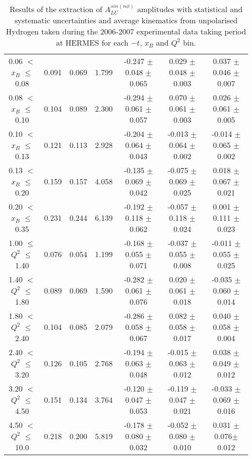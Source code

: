 \begin{table}[width=15cm]
\begin{center}
{\begin{tabular}{|c|c|c|c|c|c|c|}
0.06 $<$ $x_{B}$ $\leqslant$ 0.08 &  0.091 & 0.069 &  1.799 &  -0.247  $\pm$  0.048  $\pm$   0.065 &
0.029 $\pm$  0.048  $\pm$   0.003 & 0.037 $\pm$   0.046  $\pm$   0.007\\
0.08 $<$ $x_{B}$ $\leqslant$ 0.10 &  0.104 & 0.089 &  2.300 &  -0.294 $\pm$  0.061  $\pm$   0.057 &
0.070 $\pm$   0.061  $\pm$   0.003 & 0.026  $\pm$  0.061  $\pm$   0.005\\
0.10 $<$ $x_{B}$ $\leqslant$ 0.13 &  0.121 &  0.113 &  2.928 &  -0.204  $\pm$  0.064   $\pm$  0.043 & 
-0.013  $\pm$  0.064  $\pm$   0.002 & -0.014  $\pm$  0.065  $\pm$   0.002\\
0.13 $<$ $x_{B}$ $\leqslant$ 0.20 &  0.159 & 0.157 &  4.058&  -0.135  $\pm$  0.069  $\pm$   0.042 &
-0.075  $\pm$  0.069  $\pm$   0.025 & 0.018  $\pm$  0.067  $\pm$   0.021 \\
0.20 $<$ $x_{B}$ $\leqslant$ 0.35 &  0.231 & 0.244 &  6.139 &  -0.192 $\pm$ 0.118  $\pm$   0.062 &
-0.057  $\pm$  0.118 $\pm$    0.024 & 0.001  $\pm$  0.111  $\pm$  0.023\\
\hline
1.00 $\leqslant$ $Q^{2}$ $\leqslant$ 1.40 &  0.076 & 0.054  & 1.199 &  -0.168  $\pm$  0.055  $\pm$   0.071 &
-0.037 $\pm$   0.055  $\pm$   0.008 & -0.011  $\pm$  0.055   $\pm$  0.025 \\
1.40 $<$ $Q^{2}$ $\leqslant$ 1.80 &  0.089 & 0.069 &  1.590 &  -0.282 $\pm$  0.061  $\pm$   0.076 &
0.020  $\pm$  0.061  $\pm$   0.018 & -0.035 $\pm$   0.060  $\pm$   0.014\\
1.80 $<$ $Q^{2}$ $\leqslant$ 2.40 &  0.104 & 0.085 &  2.079 &  -0.286 $\pm$   0.058  $\pm$   0.067 &
0.082 $\pm$   0.058  $\pm$   0.017 & 0.040  $\pm$  0.058  $\pm$   0.004\\
2.40 $<$ $Q^{2}$ $\leqslant$ 3.20 &  0.126 & 0.105  & 2.768 &  -0.194 $\pm$   0.063  $\pm$   0.048 &
-0.015  $\pm$  0.063 $\pm$    0.012 & 0.038   $\pm$ 0.049  $\pm$   0.012\\
3.20 $<$ $Q^{2}$ $\leqslant$ 4.50 &  0.151 & 0.134 &  3.764 &  -0.120 $\pm$   0.047  $\pm$   0.053 &
-0.119  $\pm$  0.047 $\pm$    0.021 & -0.033 $\pm$   0.069  $\pm$   0.016\\
4.50 $<$ $Q^{2}$ $\leqslant$ 10.0 &  0.218 & 0.200 &  5.819 &  -0.178  $\pm$  0.080 $\pm$    0.032 &
-0.052  $\pm$  0.080  $\pm$   0.010 & 0.031 $\pm$  0.076$ \pm$  0.012\\
\hline
  \end{tabular}
}
 \end{center}
\caption{Results of the extraction of $A_{LU}^{sin(n\phi)}$ amplitudes with statistical and systematic uncertainties and average kinematics from unpolarised Hydrogen taken during
the 2006-2007 experimental data taking period at HERMES for each $-t$, $x_{B}$ and $Q^{2}$ bin.
}
\end{table}

